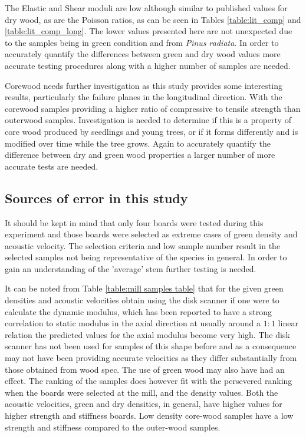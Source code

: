 \documentclass[10pt]{article}
\begin{document}
The Elastic and Shear moduli are low although similar to published values for dry wood, as are the Poisson ratios, as can be seen in Tables \ref{table:lit_comp} and \ref{table:lit_comp_long}. The lower values presented here are not unexpected due to the samples being in green condition and from \textit{Pinus radiata}. In order to accurately quantify the differences between green and dry wood values more accurate testing procedures along with a higher number of samples are needed.

Corewood needs further investigation as this study provides some interesting results, particularly the failure planes in the longitudinal direction. With the corewood samples providing a higher ratio of compressive to tensile strength than outerwood samples. Investigation is needed to determine if this is a property of core wood produced by seedlings and young trees, or if it forms differently and is modified over time while the tree grows. Again to accurately quantify the difference between dry and green wood properties a larger number of more accurate tests are needed.


\subsection{Sources of error in this study}
\label{sec:dis_error}

It should be kept in mind that only four boards were tested during this experiment and those boards were selected as extreme cases of green density and acoustic velocity. The selection criteria and low sample number result in the selected samples not being representative of the species in general. In order to gain an understanding of the 'average' stem further testing is needed.

It can be noted from Table \ref{table:mill samples table} that for the given green densities and acoustic velocities obtain using the disk scanner if one were to calculate the dynamic modulus, which has been reported to have a strong correlation to static modulus in the axial direction \citep{lindstrom_stiffness_2004,lindstrom_methods_2002} at usually around a \(1:1\) linear relation the predicted values for the axial modulus become very high. The disk scanner has not been used for samples of this shape before and as a consequence may not have been providing accurate velocities as they differ substantially from those obtained from wood spec.  The use of green wood may also have had an effect. The ranking of the samples does however fit with the persevered ranking when the boards were selected at the mill, and the density values. Both the acoustic velocities, green and dry densities, in general, have higher values for higher strength and stiffness boards. Low density core-wood samples have a low strength and stiffness compared to the outer-wood samples.
\end{document}
